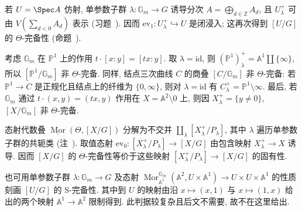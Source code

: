 \begin{example}\label{src:7.9.27}
若 $U=\Spec A$ 仿射, 单参数子群 $\lambda:\mathbb G_m\to G$ 诱导分次 $A=\bigoplus_{d\in\mathbb Z}A_d$, 且 $U_\lambda^+$ 可由 $V(\sum_{d<0}A_d)$ 表示 (习题~). 因而 $\mathrm{ev}_1:U_\lambda^+\hookrightarrow U$ 是闭浸入; 这再次得到 $[U/G]$ 的 $\Theta$-完备性 (命题~).
\end{example}
\begin{example}\label{src:7.9.28}
考虑 $\mathbb G_m$ 在 $\mathbb P^1$ 上的作用 $t\cdot[x:y]=[tx:y]$. 取 $\lambda=\mathrm{id}$, 则 $(\mathbb P^1)_\lambda^+=\mathbb A^1\coprod\{\infty\}$, 所以 $[\mathbb P^1/\mathbb G_m]$ 非 $\Theta$-完备. 同样, 结点三次曲线 $C$ 的商叠 $[C/\mathbb G_m]$ 非 $\Theta$-完备: 若 $\mathbb P^1\to C$ 是正规化且结点上的纤维为 $\{0,\infty\}$, 则对 $\lambda=\mathrm{id}$ 有 $C_\lambda^+=\mathbb P^1\setminus\infty$. 最后, 若 $\mathbb G_m$ 通过 $t\cdot(x,y)=(tx,y)$ 作用在 $X=\mathbb A^2\setminus0$ 上, 则因 $X_\lambda^+=\{y\ne0\}$, $[X/\mathbb G_m]$ 非 $\Theta$-完备.
\end{example}
\begin{remark}\label{src:7.9.29}
态射代数叠 $\underline{\operatorname{Mor}}(\Theta,[X/G])$ 分解为不交并 $\coprod_\lambda[X_\lambda^+/P_\lambda]$, 其中 $\lambda$ 遍历单参数子群的共轭类 (注~). 取值态射 $\mathrm{ev}_0:[X_\lambda^+/P_\lambda]\to[X/G]$ 由包含映射 $X_\lambda^+\to X$ 诱导. 因而 $[X/G]$ 的 $\Theta$-完备性等价于这些映射 $[X_\lambda^+/P_\lambda]\to[X/G]$ 的固有性.
\end{remark}
也可用单参数子群 $\lambda:\mathbb G_m\to G$ 及态射 $\operatorname{Mor}_{\mathbb A^1}^{\mathbb G_m}(\mathbb A^2,U\times\mathbb A^1)\to U\times U\times\mathbb A^1$ 的性质刻画 $[U/G]$ 的 S-完备性. 其中到 $U$ 的映射由沿 $x\mapsto(x,1)$ 与 $x\mapsto(1,x)$ 给出的两个映射 $\mathbb A^1\to\mathbb A^2$ 限制得到. 此判据较复杂且后文不需要, 故不在这里给出.

